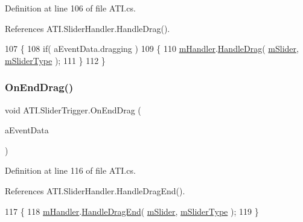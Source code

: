Definition at line 106 of file A\+T\+I.\+cs.



References A\+T\+I.\+Slider\+Handler.\+Handle\+Drag().


\begin{DoxyCode}
107         \{
108             \textcolor{keywordflow}{if}( aEventData.dragging )
109             \{
110                 \hyperlink{class_a_t_i_1_1_slider_trigger_ab2c5ecc1828e1618dc7966aa815fdaba}{mHandler}.\hyperlink{class_a_t_i_1_1_slider_handler_a0ef4eeb2a91b744eaaf2453856aded60}{HandleDrag}( \hyperlink{class_a_t_i_1_1_slider_trigger_adb4a609592234cac1451eeeb2d394740}{mSlider}, 
      \hyperlink{class_a_t_i_1_1_slider_trigger_a62a01bc9c41be54f58bd77664181fd5d}{mSliderType} );
111             \}
112         \}
\end{DoxyCode}
\mbox{\label{class_a_t_i_1_1_slider_trigger_ae58a83edce79a49d1fd21317c7536b48}} 
\subsubsection{\texorpdfstring{On\+End\+Drag()}{OnEndDrag()}}
{\footnotesize\ttfamily void A\+T\+I.\+Slider\+Trigger.\+On\+End\+Drag (\begin{DoxyParamCaption}\item[{Pointer\+Event\+Data}]{a\+Event\+Data }\end{DoxyParamCaption})}



Definition at line 116 of file A\+T\+I.\+cs.



References A\+T\+I.\+Slider\+Handler.\+Handle\+Drag\+End().


\begin{DoxyCode}
117         \{
118             \hyperlink{class_a_t_i_1_1_slider_trigger_ab2c5ecc1828e1618dc7966aa815fdaba}{mHandler}.\hyperlink{class_a_t_i_1_1_slider_handler_ada65f41ef84f50737cece7be16c548f9}{HandleDragEnd}( \hyperlink{class_a_t_i_1_1_slider_trigger_adb4a609592234cac1451eeeb2d394740}{mSlider}, 
      \hyperlink{class_a_t_i_1_1_slider_trigger_a62a01bc9c41be54f58bd77664181fd5d}{mSliderType} );
119         \}
\end{DoxyCode}
\mbox{\label{class_a_t_i_1_1_slider_trigger_a258f79d013266d0c82a5382525adcdef}} 
